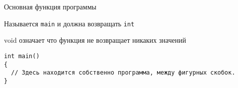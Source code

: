 \begin{frame}[t,fragile]{Основная функция программы}

Называется \texttt{main} и должна возвращать \texttt{int}

void означает что функция не возвращает никаких значений

\begin{lstlisting}
int main()  
{	         
  // Здесь находится собственно программа, между фигурных скобок.
}
\end{lstlisting}

\end{frame}

